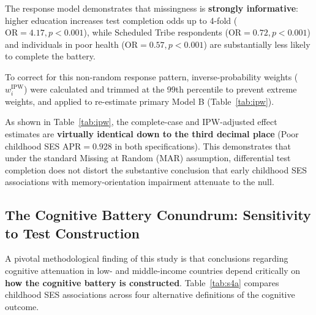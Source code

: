 The response model demonstrates that missingness is \textbf{strongly informative}: higher education increases test completion odds up to 4-fold ($\text{OR} = 4.17, p < 0.001$), while Scheduled Tribe respondents ($\text{OR} = 0.72, p < 0.001$) and individuals in poor health ($\text{OR} = 0.57, p < 0.001$) are substantially less likely to complete the battery. 

To correct for this non-random response pattern, inverse-probability weights ($w_i^{\text{IPW}}$) were calculated and trimmed at the 99th percentile to prevent extreme weights, and applied to re-estimate primary Model B (Table~\ref{tab:ipw}).

\begin{table}[!htbp]
\centering
\small
\caption{\textbf{Comparison of Complete-Case vs. Inverse-Probability-Weighted (IPW) Model B Cognitive Estimates ($\mathbf{N=57{,}245}$).}}
\label{tab:ipw}
\end{table}

As shown in Table~\ref{tab:ipw}, the complete-case and IPW-adjusted effect estimates are \textbf{virtually identical down to the third decimal place} (Poor childhood SES $\text{APR} = 0.928$ in both specifications). This demonstrates that under the standard Missing at Random (MAR) assumption, differential test completion does not distort the substantive conclusion that early childhood SES associations with memory-orientation impairment attenuate to the null.

\subsection{The Cognitive Battery Conundrum: Sensitivity to Test Construction}
A pivotal methodological finding of this study is that conclusions regarding cognitive attenuation in low- and middle-income countries depend critically on \textbf{how the cognitive battery is constructed}. Table~\ref{tab:s4a} compares childhood SES associations across four alternative definitions of the cognitive outcome.


